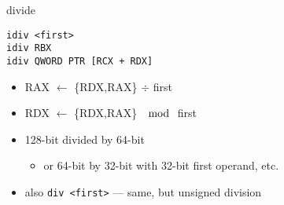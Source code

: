 \begin{frame}[fragile,label=div]{divide}
\begin{lstlisting}
idiv <first>
idiv RBX
idiv QWORD PTR [RCX + RDX]
\end{lstlisting}
\begin{itemize}
\item RAX $\leftarrow$ \{RDX,RAX\} $\div$ first
\item RDX $\leftarrow$ \{RDX,RAX\} $\mod$ first
\item 128-bit divided by 64-bit
    \begin{itemize}
    \item or 64-bit by 32-bit with 32-bit first operand, etc.
    \end{itemize}
\item also \lstinline|div <first>| --- same, but unsigned division
\end{itemize}
\end{frame}
